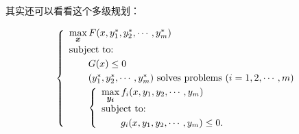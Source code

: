 其实还可以看看这个多级规划：

\begin{equation}\label{bilevel}
\left\{\begin{array}{l}
\max\limits_{{\mbox{\footnotesize\boldmath $x$}}} F(x,y_1^*,y_2^*,\cdots,y_m^*)\\[0.2cm]
\mbox{subject to:}\\[0.1cm]
\qquad G(x)\le 0\\[0.1cm]
\qquad(y_1^*,y_2^*,\cdots,y_m^*)\mbox{ solves problems }(i=1,2,\cdots,m)\\[0.1cm]
\qquad\left\{\begin{array}{l}
    \max\limits_{{\mbox{\footnotesize\boldmath $y_i$}}}f_i(x,y_1,y_2,\cdots,y_m)\\[0.2cm]
    \mbox{subject to:}\\[0.1cm]
    \qquad g_i(x,y_1,y_2,\cdots,y_m)\le 0.
    \end{array}\right.
\end{array}\right.
\end{equation}


